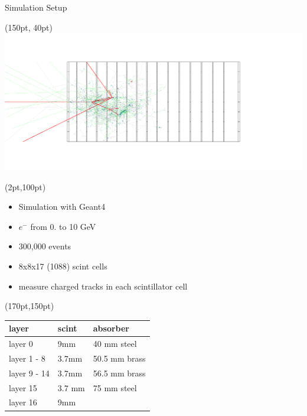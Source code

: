 \documentclass[10pt]{beamer}
\begin{document}
\begin{frame}{Simulation Setup}
  \begin{textblock*}{220pt}(150pt, 40pt)
    \includegraphics[width=\textwidth]{../images/side.png}
  \end{textblock*}
  \begin{textblock*}{150pt}(2pt,100pt)
    \begin{itemize}
    \item Simulation with Geant4\small{}
    \item $e^-$ from 0. to 10 GeV
    \item 300,000 events
    \item 8x8x17 (1088) scint cells
    \item measure charged tracks in each scintillator cell
    \end{itemize}
  \end{textblock*}
  \begin{textblock*}{10pt}(170pt,150pt)
    \begin{tabular}{l|l|l}
      layer  & scint    & absorber \\ \hline
      layer 0      & 9mm     & 40 mm steel\\
      layer 1 - 8  & 3.7mm   & 50.5 mm brass \\
      layer 9 - 14 & 3.7mm   & 56.5 mm brass \\
      layer 15     & 3.7 mm  & 75 mm steel\\
      layer 16     & 9mm     &                      
    \end{tabular}
  \end{textblock*}
\end{frame}
\end{document}
